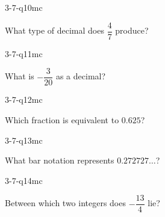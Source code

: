 \begin{practiceQuestion}{3-7-q10}{mc}
\begin{questionText}
What type of decimal does $\dfrac{4}{7}$ produce?
\end{questionText}
\end{practiceQuestion}

\begin{practiceQuestion}{3-7-q11}{mc}
\begin{questionText}
What is $-\dfrac{3}{20}$ as a decimal?
\end{questionText}
\end{practiceQuestion}

\begin{practiceQuestion}{3-7-q12}{mc}
\begin{questionText}
Which fraction is equivalent to $0.625$?
\end{questionText}
\end{practiceQuestion}

\begin{practiceQuestion}{3-7-q13}{mc}
\begin{questionText}
What bar notation represents $0.272727\ldots$?
\end{questionText}
\end{practiceQuestion}

\begin{practiceQuestion}{3-7-q14}{mc}
\begin{questionText}
Between which two integers does $-\dfrac{13}{4}$ lie?
\end{questionText}
\end{practiceQuestion}

